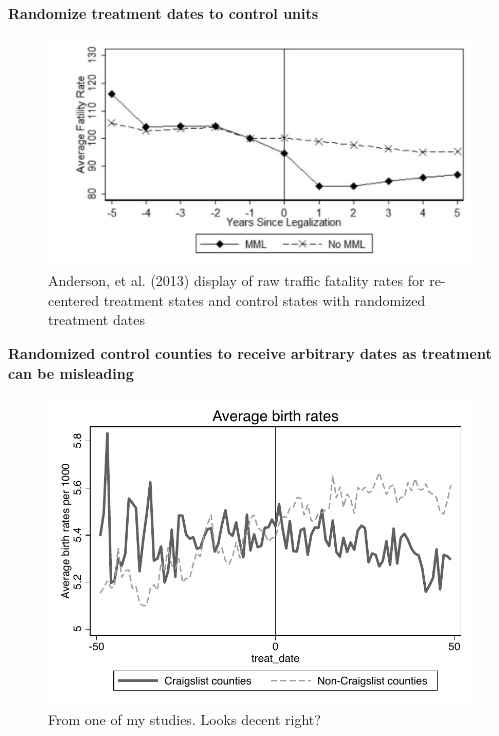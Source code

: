 \documentclass[notes=show]{beamer}
\begin{document}
\begin{frame}[plain]
\begin{center}
\textbf{Randomize treatment dates to control units}
\end{center}

	\begin{figure}
	\includegraphics[scale=0.25]{./lecture_includes/mml_eventstudy}
	\caption{Anderson, et al. (2013) display of raw traffic fatality rates for re-centered treatment states and control states with randomized treatment dates}
	\end{figure}

\end{frame}

\begin{frame}[plain]
\begin{center}
\textbf{Randomized control counties to receive arbitrary dates as treatment can be misleading}
\end{center}

	\begin{figure}
	\includegraphics[scale=0.5]{./lecture_includes/dd.pdf}
	\caption{From one of my studies. Looks decent right?}
	\end{figure}

\end{frame}
\end{document}
